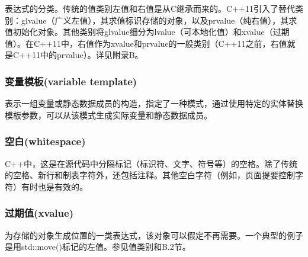 表达式的分类。传统的值类别左值和右值是从C继承而来的。C++11引入了替代类别：glvalue（广义左值），其求值标识存储的对象，以及prvalue（纯右值），其求值初始化对象。其他类别将glvalue细分为lvalue（可本地化值）和xvalue（过期值）。在C++11中，右值作为xvalue和prvalue的一般类别（C++11之前，右值就是C++11中的prvalue）。详见附录B。

\subsubsection{变量模板(variable template)}

表示一组变量或静态数据成员的构造，指定了一种模式，通过使用特定的实体替换模板参数，可以从该模式生成实际变量和静态数据成员。

\subsubsection{空白(whitespace)}

C++中，这是在源代码中分隔标记（标识符、文字、符号等）的空格。除了传统的空格、新行和制表字符外，还包括注释。其他空白字符（例如，页面提要控制字符）有时也是有效的。

\subsubsection{过期值(xvalue)}

为存储的对象生成位置的一类表达式，该对象可以假定不再需要。一个典型的例子是用std::move()标记的左值。参见值类别和B.2节。




















